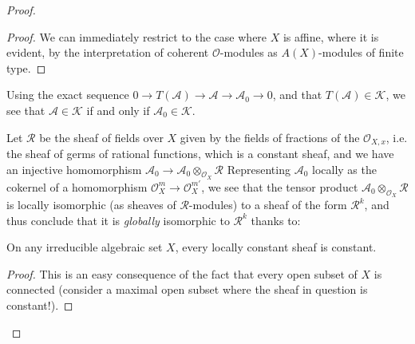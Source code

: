 \documentclass{article}
\theoremstyle{plain}
\newenvironment{lemma}[1]
    {\renewcommand\theinnercustomlemma{#1}\innercustomlemma}
    {\endinnercustomlemma}
\theoremstyle{definition}
\newcommand{\sh}{\mathscr}
\newcommand{\cat}{\mathcal}
\begin{document}
\begin{proof}
  \begin{proof}
    We can immediately restrict to the case where $X$ is affine, where it is evident, by the interpretation of coherent $\sh{O}$-modules as $A(X)$-modules of finite type.
  \end{proof}

  Using the exact sequence $0\to T(\sh{A})\to \sh{A}\to \sh{A}_0\to 0$, and that $T(\sh{A})\in\cat{K}$, we see that $\sh{A}\in\cat{K}$ if and only if $\sh{A}_0\in\cat{K}$.

  Let $\sh{R}$ be the sheaf of fields over $X$ given by the fields of fractions of the $\sh{O}_{X,x}$, i.e. the sheaf of germs of rational functions, which is a constant sheaf, and we have an injective homomorphism $\sh{A}_0\to\sh{A}_0\otimes_{\sh{O}_X}\sh{R}$
  Representing $\sh{A}_0$ locally as the cokernel of a homomorphism $\sh{O}_X^m\to\sh{O}_X^{m'}$, we see that the tensor product $\sh{A}_0\otimes_{\sh{O}_X}\sh{R}$ is locally isomorphic (as sheaves of $\sh{R}$-modules) to a sheaf of the form $\sh{R}^k$, and thus conclude that it is \emph{globally} isomorphic to $\sh{R}^k$ thanks to:

  \begin{lemma}{3}
  \label{lemma3}
    On any irreducible algebraic set $X$, every locally constant sheaf is constant.
  \end{lemma}

  \begin{proof}
    This is an easy consequence of the fact that every open subset of $X$ is connected (consider a maximal open subset where the sheaf in question is constant!).
  \end{proof}


\end{proof}
\end{document}
